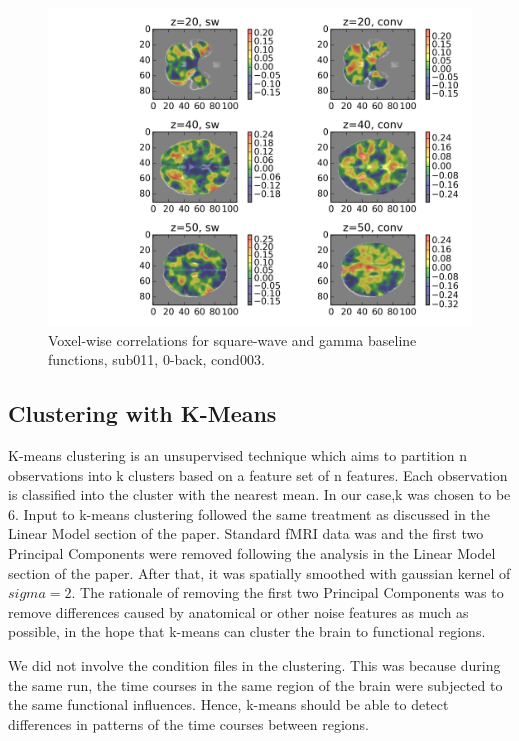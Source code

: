 \documentclass[11pt]{article}
\begin{document}
\begin{figure}[H]
\centering
\includegraphics[scale=0.7]{../results/sub011_voxel_wise_correlation_across_methods.png}
\caption{Voxel-wise correlations for square-wave and gamma baseline functions, sub011, 0-back, cond003.}
\end{figure} 

\subsection{Clustering with K-Means}

K-means clustering is an unsupervised technique which aims to partition n
observations into k clusters based on a feature set of n features. Each
observation is classified into the cluster with the nearest mean. In our case,k was
chosen to be 6. Input to k-means clustering followed the same treatment as discussed
in the Linear Model section of the paper. Standard fMRI data was and the first two 
Principal Components were removed following the analysis in the Linear Model section 
of the paper. After that, it was spatially smoothed with gaussian kernel
of $sigma=2$. The rationale of removing the first two Principal Components was to
remove differences caused by anatomical or other noise features as much as possible, in
the hope that k-means can cluster the brain to functional regions.

We did not involve the condition files in the clustering. This was because during
the same run, the time courses in the same region of the brain were subjected to the
same functional influences. Hence, k-means should be able to detect differences in
patterns of the time courses between regions.
\end{document}
